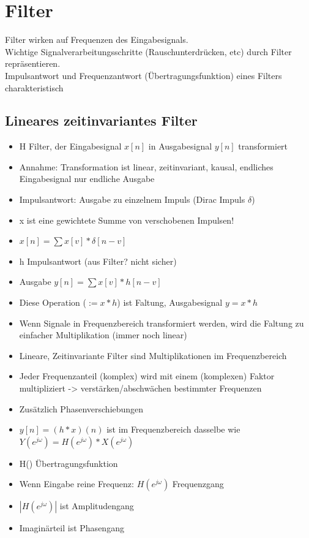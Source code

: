 \documentclass[a4paper,10pt,oneside]{article}
\begin{document}
\section{Filter}
Filter wirken auf Frequenzen des Eingabesignals.\\
Wichtige Signalverarbeitungsschritte (Rauschunterdrücken, etc) durch Filter repräsentieren.\\
Impulsantwort und Frequenzantwort (Übertragungsfunktion) eines Filters charakteristisch

\subsection{Lineares zeitinvariantes Filter}
\begin{itemize}
	\item H Filter, der Eingabesignal $x[n]$ in Ausgabesignal $y[n]$ transformiert
	\item Annahme: Transformation ist linear, zeitinvariant, kausal, endliches Eingabesignal nur endliche Ausgabe
	\item Impulsantwort: Ausgabe zu einzelnem Impuls (Dirac Impuls $\delta$)
	\item x ist eine gewichtete Summe von verschobenen Impulsen!
	\item $x[n] = \sum x[v] * \delta[n-v]$
	\item h Impulsantwort (aus Filter? nicht sicher)
	\item Ausgabe $y[n] = \sum x[v] * h[n-v]$
	\item Diese Operation ($:= x*h$) ist Faltung, Ausgabesignal $y = x*h$
	\item Wenn Signale in Frequenzbereich transformiert werden, wird die Faltung zu einfacher Multiplikation (immer noch linear)
	\item Lineare, Zeitinvariante Filter sind Multiplikationen im Frequenzbereich
	\item Jeder Frequenzanteil (komplex) wird mit einem (komplexen) Faktor multipliziert -> verstärken/abschwächen bestimmter Frequenzen
	\item Zusätzlich Phasenverschiebungen
	\item $y[n] = (h*x)(n)$ ist im Frequenzbereich dasselbe wie $Y(e^{j\omega}) = H(e^{j\omega}) * X(e^{j\omega})$
	\item H() Übertragungsfunktion
	\item Wenn Eingabe reine Frequenz: $H(e^{j\omega})$ Frequenzgang
	\item $|H(e^{j\omega})|$ ist Amplitudengang
	\item Imaginärteil ist Phasengang
\end{itemize}
\end{document}
